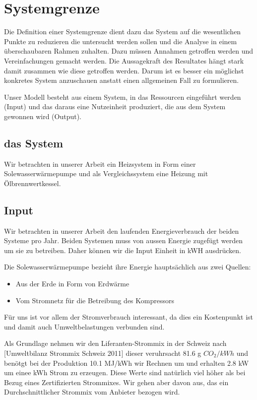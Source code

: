 \chapter{Systemgrenze}
\label{chap:Systemgrenze}

Die Definition einer Systemgrenze dient dazu das System auf die wesentlichen
Punkte zu reduzieren die untersucht werden sollen und die Analyse in einem
überschaubaren Rahmen zuhalten.
Dazu müssen Annahmen getroffen werden und Vereinfachungen gemacht werden.
Die Aussagekraft des Resultates hängt stark damit zusammen wie diese getroffen
werden. Darum ist es besser ein möglichst konkretes System anzuschauen anstatt
einen allgemeinen Fall zu formulieren.

Unser Modell besteht aus einem System, in das Ressourcen eingeführt werden
(Input) und das daraus eine Nutzeinheit produziert, die aus dem System gewonnen
wird (Output).

\section{das System}

Wir betrachten in unserer Arbeit ein Heizsystem in Form einer
Solewasserwärmepumpe und als Vergleichssystem eine Heizung mit
Ölbrennwertkessel.

\section{Input}

Wir betrachten in unserer Arbeit den laufenden Energieverbrauch der beiden
Systeme pro Jahr.
Beiden Systemen muss von aussen Energie zugefügt werden um sie zu betreiben.
Daher können wir die Input Einheit in kWH ausdrücken.

Die Solewasserwärmepumpe bezieht ihre Energie hauptsächlich aus zwei Quellen:
\begin{itemize}
\item Aus der Erde in Form von Erdwärme
\item Vom Stromnetz für die Betreibung des Kompressors
\end{itemize}

Für uns ist vor allem der Stromverbrauch interessant, da dies ein Kostenpunkt
ist und damit auch Umweltbelastungen verbunden sind.

Als Grundlage nehmen wir den Liferanten-Strommix in der Schweiz nach
[Umweltbilanz Strommix Schweiz 2011]
dieser veruhrsacht 81.6 g $CO_2 /kWh$
und benötgt bei der Produktion 10.1 MJ/kWh wir Rechnen um
und erhalten 2.8 kW um einee kWh Strom zu erzeugen.
Diese Werte sind natürlich viel höher als bei Bezug eines Zertifizierten 
Strommixes. Wir gehen aber davon aus, das ein Durchschnittlicher Strommix
vom Anbieter bezogen wird.

